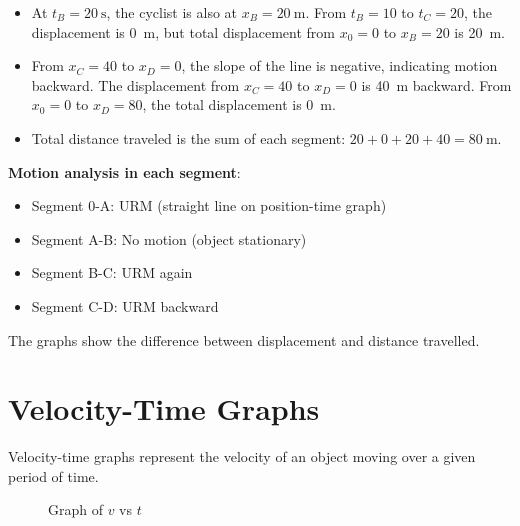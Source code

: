 \vspace*{-6pt}
\begin{itemize}[leftmargin=0pt]
        \item At \( t_B=\qty{20}{\s} \), the cyclist is also at \( x_B = \qty{20}{\metre} \).
        From \( t_B=10 \) to \( t_C=20 \), the displacement is \qty{0}{\m}, but total displacement from \( x_0 = 0 \) to \( x_B = 20 \) is \qty{20}{\m}.
        \item From \( x_C = 40 \) to \( x_D=0 \), the slope of the line is negative, indicating motion backward.
        The displacement from \( x_C = 40 \) to \( x_D = 0 \) is \qty{40}{\m} backward.
        From \( x_0 = 0 \) to \( x_D=80 \), the total displacement is \qty{0}{\m}.
        \item Total distance traveled is the sum of each segment: \( 20 + 0 + 20 + 40 = \qty{80}{\m} \).
\end{itemize}

\textbf{Motion analysis in each segment}:
\begin{itemize}
    \item Segment 0-A: URM (straight line on position-time graph)
    \item Segment A-B: No motion (object stationary)
    \item Segment B-C: URM again
    \item Segment C-D: URM backward
\end{itemize}
The graphs show the difference between displacement and distance travelled.
\section{Velocity-Time Graphs}
Velocity-time graphs represent the velocity of an object moving over a given period of time.
\begin{figure}[H]
    \centering
    \caption{Graph of \( v \) vs \( t \)}
\end{figure}

